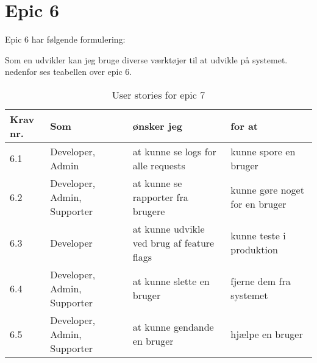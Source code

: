 \section{Epic 6}
Epic 6 har følgende formulering:

Som en udvikler kan jeg bruge diverse værktøjer til at udvikle på systemet.
nedenfor ses teabellen over epic 6.

\begin{table}[H]
    \centering
    \caption{User stories for epic 7}
    \label{tab:us-epic7}
    \begin{tabular}{p{1cm}|p{2cm}|p{6cm}|p{6cm}}
        \textbf{Krav nr.} & \textbf{Som}                & \textbf{ønsker jeg}                        & \textbf{for at}                \\\hline
        6.1               & Developer, Admin            & at kunne se logs for alle requests         & kunne spore en bruger          \\\hline
        6.2               & Developer, Admin, Supporter & at kunne se rapporter fra brugere          & kunne gøre noget for en bruger \\\hline
        6.3               & Developer                   & at kunne udvikle ved brug af feature flags & kunne teste i produktion       \\\hline
        6.4               & Developer, Admin, Supporter & at kunne slette en bruger                  & fjerne dem fra systemet        \\\hline
        6.5               & Developer, Admin, Supporter & at kunne gendande en bruger                & hjælpe en bruger               \\
    \end{tabular}
\end{table}
